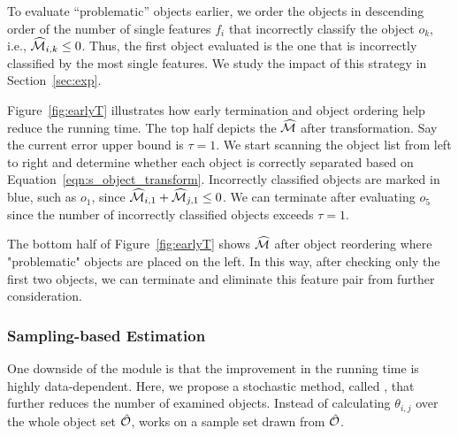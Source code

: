To evaluate ``problematic'' objects earlier, 
we order the objects in descending order of 
the number of single features $f_i$ that incorrectly 
classify the object $o_k$, i.e., $\widehat{{\mathcal{M}}}_{i,k}\leq0$. 
Thus, the first object evaluated is the one that is incorrectly 
classified by the most single features. 
We study the impact of this strategy in Section~\ref{sec:exp}.

\begin{example}
Figure~\ref{fig:earlyT} illustrates how early termination and object ordering help reduce the running time. The top half depicts the $\widehat{{\mathcal{M}}}$ after transformation. Say the current error upper bound is $\tau=1$. We start scanning the object list from left to right and determine whether each object is correctly separated based on Equation~\ref{eqn:s_object_transform}. Incorrectly classified objects are marked in blue, such as $o_1$, since $\widehat{{\mathcal{M}}}_{i,1}+\widehat{{\mathcal{M}}}_{j,1}\leq0$. We can terminate after evaluating $o_5$ since the number of incorrectly classified objects exceeds $\tau=1$.

The bottom half of Figure~\ref{fig:earlyT} shows $\widehat{{\mathcal{M}}}$ after object reordering where "problematic" objects are placed on the left. In this way, after checking only the first two objects, we can terminate and eliminate this feature pair from further consideration.
\end{example}


\subsubsection{Sampling-based Estimation} \label{ssec:sampling}

One downside of the \earlyT module 
is that the improvement in the running time is highly data-dependent. 
Here, we propose a stochastic method, called \sampling, 
that further reduces the number of examined objects. 
Instead of calculating $\theta_{i,j}$ over the 
whole object set $\hat{{\mathcal{O}}}$, \sampling works on a 
sample set drawn from $\hat{{\mathcal{O}}}$.

